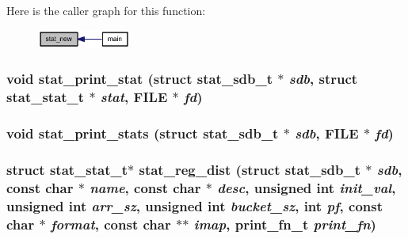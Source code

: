 Here is the caller graph for this function:\nopagebreak
\begin{figure}[H]
\begin{center}
\leavevmode
\includegraphics[width=87pt]{zesto_2stats_8h_cf6221385da9c71331ab5e4f718299da_icgraph}
\end{center}
\end{figure}
\subsubsection[{stat\_\-print\_\-stat}]{\setlength{\rightskip}{0pt plus 5cm}void stat\_\-print\_\-stat (struct {\bf stat\_\-sdb\_\-t} $\ast$ {\em sdb}, \/  struct {\bf stat\_\-stat\_\-t} $\ast$ {\em stat}, \/  FILE $\ast$ {\em fd})}\label{zesto_2stats_8h_1e642b17270bf002137ad70b5438b77c}


\subsubsection[{stat\_\-print\_\-stats}]{\setlength{\rightskip}{0pt plus 5cm}void stat\_\-print\_\-stats (struct {\bf stat\_\-sdb\_\-t} $\ast$ {\em sdb}, \/  FILE $\ast$ {\em fd})}\label{zesto_2stats_8h_dd36287ed8d81f546fb36bae677fb531}


\subsubsection[{stat\_\-reg\_\-dist}]{\setlength{\rightskip}{0pt plus 5cm}struct {\bf stat\_\-stat\_\-t}$\ast$ stat\_\-reg\_\-dist (struct {\bf stat\_\-sdb\_\-t} $\ast$ {\em sdb}, \/  const char $\ast$ {\em name}, \/  const char $\ast$ {\em desc}, \/  unsigned int {\em init\_\-val}, \/  unsigned int {\em arr\_\-sz}, \/  unsigned int {\em bucket\_\-sz}, \/  int {\em pf}, \/  const char $\ast$ {\em format}, \/  const char $\ast$$\ast$ {\em imap}, \/  {\bf print\_\-fn\_\-t} {\em print\_\-fn})\hspace{0.3cm}{\tt  [read]}}\label{zesto_2stats_8h_b68118a778041ff66b7dec8bf1030ef4}




